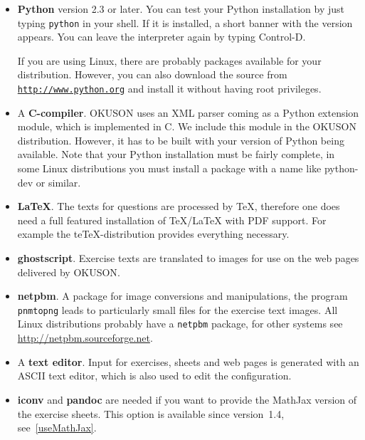 \documentclass[12pt,openany,a4paper]{book}
\newcommand{\OKUSON}{\textsf{OKUSON}}
\begin{document}
\begin{itemize}
\item \textbf{Python} version 2.3 or later. 
You can test your Python installation by
just typing \texttt{python} in your shell. If it is installed, a short
banner with the version appears. You can leave the interpreter again
by typing Control-D.

If you are using Linux, there are probably packages available for
your distribution. However, you can also download the source from
\href{http://www.python.org}{\texttt{http://www.python.org}} 
and install it without having root
privileges.
\item A \textbf{C-compiler}. {\OKUSON} uses an XML parser coming as a
Python extension module, which is implemented in C. We include this
module in the {\OKUSON} distribution. However, it has to be built with your
version of Python being available. Note that your Python installation must be
fairly complete, in some Linux distributions you must install a package with
a name like python-dev or similar.
\item \textbf{\LaTeX}. The texts for questions are processed by {\TeX}, 
therefore one does need a full featured installation of {\TeX/\LaTeX} 
with PDF support. For example the teTeX-distribution provides everything
necessary.
\item \textbf{ghostscript}. Exercise texts are translated to images for use
on the web pages delivered by {\OKUSON}.
\item \textbf{netpbm}. A package for image conversions and manipulations,
the program \texttt{pnmtopng} leads to particularly small files for the
exercise text images. All Linux distributions probably have a
\texttt{netpbm} package, for other systems see
\href{http://netpbm.sourceforge.net}{http://netpbm.sourceforge.net}.
\item A \textbf{text editor}. Input for exercises, sheets and web pages
is generated with an ASCII text editor, which is also used to edit
the configuration.
\item \textbf{iconv} and \textbf{pandoc} are needed if you want to provide 
the MathJax version of the exercise sheets. This option is available since
version~1.4, see~\ref{useMathJax}.
\end{itemize}
\end{document}
